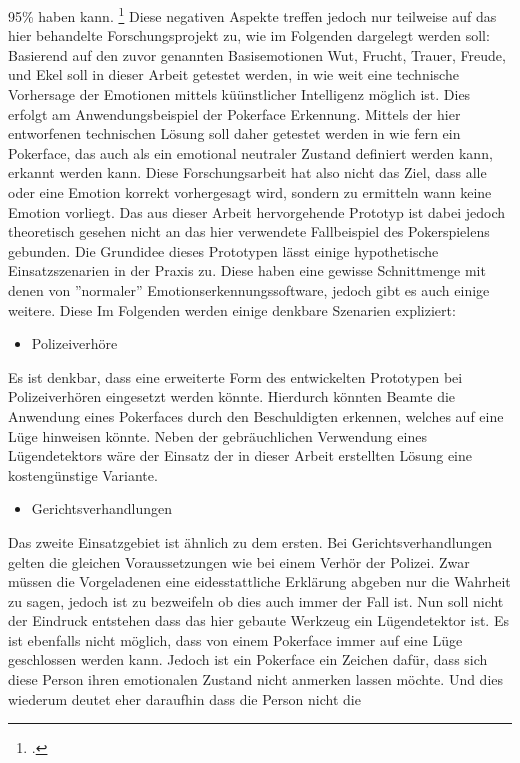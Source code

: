 \documentclass[12pt, a4paper]{report}
\begin{document}
95\% haben kann.
\footcite[Vgl.][Ergebnis]{Frauenhofer}
Diese negativen Aspekte treffen jedoch nur teilweise auf das hier behandelte Forschungsprojekt zu, wie im Folgenden dargelegt werden soll:
Basierend auf den zuvor genannten Basisemotionen Wut, Frucht, Trauer, Freude, und Ekel soll in dieser Arbeit getestet werden, in wie weit eine technische Vorhersage der Emotionen mittels küünstlicher Intelligenz möglich ist. Dies erfolgt am Anwendungsbeispiel der Pokerface Erkennung. Mittels der hier entworfenen technischen Lösung soll daher getestet werden in wie fern ein Pokerface, das auch als ein emotional neutraler Zustand definiert werden kann, erkannt werden kann.
Diese Forschungsarbeit hat also nicht das Ziel, dass alle oder eine Emotion korrekt vorhergesagt wird, sondern zu ermitteln wann keine Emotion vorliegt.
Das aus dieser Arbeit hervorgehende Prototyp  ist dabei jedoch theoretisch gesehen nicht an das hier verwendete Fallbeispiel des Pokerspielens gebunden. Die Grundidee dieses Prototypen lässt einige hypothetische Einsatzszenarien in der Praxis zu.
 Diese haben eine gewisse Schnittmenge mit denen von ''normaler'' Emotionserkennungssoftware, jedoch gibt es auch einige weitere. Diese  Im Folgenden werden
einige denkbare Szenarien expliziert:
\begin{itemize}
	\item{Polizeiverhöre}
\end{itemize}
Es ist denkbar, dass eine erweiterte Form des entwickelten Prototypen bei Polizeiverhören eingesetzt werden könnte. Hierdurch könnten Beamte die Anwendung eines Pokerfaces durch den Beschuldigten erkennen, welches auf eine Lüge hinweisen könnte. Neben der gebräuchlichen Verwendung eines Lügendetektors wäre der Einsatz der in dieser Arbeit erstellten Lösung eine kostengünstige Variante.
\begin{itemize}
	\item{Gerichtsverhandlungen}
\end{itemize}
Das zweite Einsatzgebiet ist ähnlich zu dem ersten. Bei Gerichtsverhandlungen gelten die gleichen Voraussetzungen wie bei einem Verhör der Polizei. Zwar müssen die Vorgeladenen eine
eidesstattliche Erklärung abgeben nur die Wahrheit zu sagen, jedoch ist zu bezweifeln ob dies auch immer der Fall ist.
Nun soll nicht der Eindruck entstehen dass das hier gebaute Werkzeug ein Lügendetektor ist. Es ist ebenfalls nicht möglich, dass von einem Pokerface immer auf eine Lüge geschlossen werden kann.
Jedoch ist ein Pokerface ein Zeichen dafür, dass sich diese Person ihren emotionalen Zustand nicht anmerken lassen möchte. Und dies wiederum deutet eher daraufhin dass die Person nicht die
\end{document}
